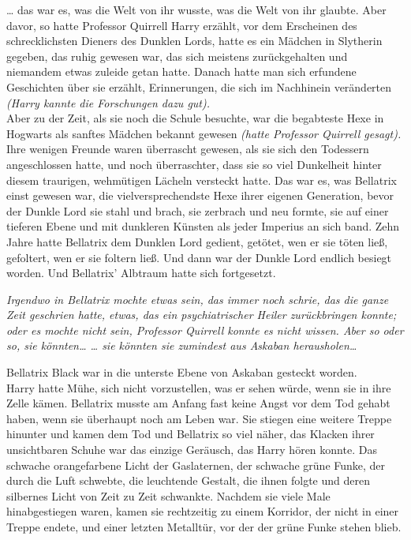 {… das war es, was die Welt von ihr wusste, was die Welt von ihr glaubte. Aber davor, so hatte Professor Quirrell Harry erzählt, vor dem Erscheinen des schrecklichsten Dieners des Dunklen Lords, hatte es ein Mädchen in Slytherin gegeben, das ruhig gewesen war, das sich meistens zurückgehalten und niemandem etwas zuleide getan hatte. Danach hatte man sich erfundene Geschichten über sie erzählt, Erinnerungen, die sich im Nachhinein veränderten \emph{(Harry kannte die Forschungen dazu gut).}\\ Aber zu der Zeit, als sie noch die Schule besuchte, war die begabteste Hexe in Hogwarts als sanftes Mädchen bekannt gewesen \emph{(hatte Professor Quirrell gesagt).}\\ Ihre wenigen Freunde waren überrascht gewesen, als sie sich den Todessern angeschlossen hatte, und noch überraschter, dass sie so viel Dunkelheit hinter diesem traurigen, wehmütigen Lächeln versteckt hatte. Das war es, was Bellatrix einst gewesen war, die vielversprechendste Hexe ihrer eigenen Generation, bevor der Dunkle Lord sie stahl und brach, sie zerbrach und neu formte, sie auf einer tieferen Ebene und mit dunkleren Künsten als jeder Imperius an sich band. Zehn Jahre hatte Bellatrix dem Dunklen Lord gedient, getötet, wen er sie töten ließ, gefoltert, wen er sie foltern ließ. Und dann war der Dunkle Lord endlich besiegt worden. Und Bellatrix' Albtraum hatte sich fortgesetzt.

\emph{Irgendwo in Bellatrix mochte etwas sein, das immer noch schrie, das die ganze Zeit geschrien hatte, etwas, das ein psychiatrischer Heiler zurückbringen konnte; oder es mochte nicht sein, Professor Quirrell konnte es nicht wissen. Aber so oder so, sie könnten… … sie könnten sie zumindest aus Askaban herausholen…}

Bellatrix Black war in die unterste Ebene von Askaban gesteckt worden.\\ Harry hatte Mühe, sich nicht vorzustellen, was er sehen würde, wenn sie in ihre Zelle kämen. Bellatrix musste am Anfang fast keine Angst vor dem Tod gehabt haben, wenn sie überhaupt noch am Leben war. Sie stiegen eine weitere Treppe hinunter und kamen dem Tod und Bellatrix so viel näher, das Klacken ihrer unsichtbaren Schuhe war das einzige Geräusch, das Harry hören konnte. Das schwache orangefarbene Licht der Gaslaternen, der schwache grüne Funke, der durch die Luft schwebte, die leuchtende Gestalt, die ihnen folgte und deren silbernes Licht von Zeit zu Zeit schwankte. Nachdem sie viele Male hinabgestiegen waren, kamen sie rechtzeitig zu einem Korridor, der nicht in einer Treppe endete, und einer letzten Metalltür, vor der der grüne Funke stehen blieb.

}
